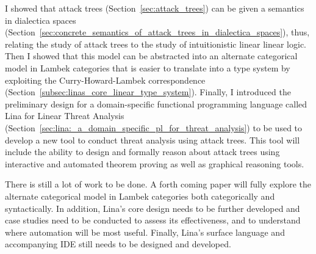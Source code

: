 I showed that attack trees (Section~\ref{sec:attack_trees}) can be
given a semantics in dialectica spaces
(Section~\ref{sec:concrete_semantics_of_attack_trees_in_dialectica_spaces}),
thus, relating the study of attack trees to the study of
intuitionistic linear linear logic.  Then I showed that this model can
be abstracted into an alternate categorical model in Lambek categories
that is easier to translate into a type system by exploiting the
Curry-Howard-Lambek correspondence
(Section~\ref{subsec:linas_core_linear_type_system}).  Finally, I
introduced the preliminary design for a domain-specific functional
programming language called Lina for Linear Threat Analysis
(Section~\ref{sec:lina:_a_domain_specific_pl_for_threat_analysis}) to
be used to develop a new tool to conduct threat analysis using attack
trees.  This tool will include the ability to design and formally
reason about attack trees using interactive and automated theorem
proving as well as graphical reasoning tools.

There is still a lot of work to be done.  A forth coming paper will
fully explore the alternate categorical model in Lambek categories
both categorically and syntactically.  In addition, Lina's core design
needs to be further developed and case studies need to be conducted to
assess its effectiveness, and to understand where automation will be
most useful.  Finally, Lina's surface language and accompanying IDE
still needs to be designed and developed.




  


